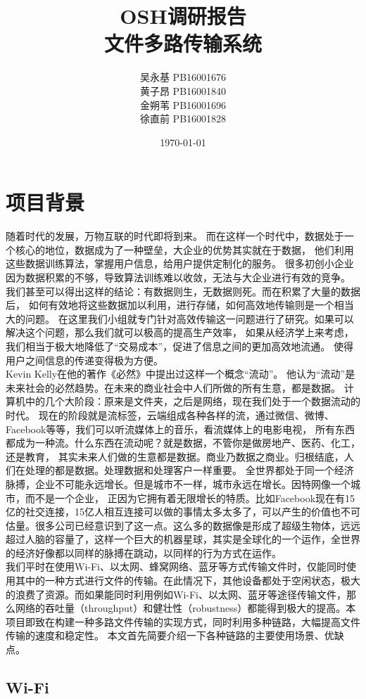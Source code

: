 \documentclass[11pt]{article}
\title{OSH调研报告\\[2ex]文件多路传输系统}
\author{吴永基 PB16001676\\黄子昂 PB16001840\\金朔苇 PB16001696\\徐直前 PB16001828}
\date{\today}
\begin{document}
\maketitle
\tableofcontents

\section{项目背景}
随着时代的发展，万物互联的时代即将到来。
而在这样一个时代中，数据处于一个核心的地位，数据成为了一种壁垒，大企业的优势其实就在于数据，
他们利用这些数据训练算法，掌握用户信息，给用户提供定制化的服务。
很多初创小企业因为数据积累的不够，导致算法训练难以收敛，无法与大企业进行有效的竞争。
我们甚至可以得出这样的结论：有数据则生，无数据则死。而在积累了大量的数据后，
如何有效地将这些数据加以利用，进行存储，如何高效地传输则是一个相当大的问题。
在这里我们小组就专门针对高效传输这一问题进行了研究。如果可以解决这个问题，那么我们就可以极高的提高生产效率，
如果从经济学上来考虑，我们相当于极大地降低了“交易成本”，促进了信息之间的更加高效地流通。
使得用户之间信息的传递变得极为方便。
\\
Kevin Kelly在他的著作《必然》中提出过这样一个概念“流动”。
他认为“流动”是未来社会的必然趋势。在未来的商业社会中人们所做的所有生意，都是数据。
计算机中的几个大阶段：原来是文件夹，之后是网络，现在我们处于一个数据流动的时代。
现在的阶段就是流标签，云端组成各种各样的流，通过微信、微博、Facebook等等，我们可以听流媒体上的音乐，看流媒体上的电影电视，
所有东西都成为一种流。什么东西在流动呢？就是数据，不管你是做房地产、医药、化工，还是教育，
其实未来人们做的生意都是数据。商业乃数据之商业。归根结底，人们在处理的都是数据。处理数据和处理客户一样重要。
全世界都处于同一个经济脉搏，企业不可能永远增长。但是城市不一样，城市永远在增长。因特网像一个城市，而不是一个企业，
正因为它拥有着无限增长的特质。比如Facebook现在有15亿的社交连接，15亿人相互连接可以做的事情太多太多了，可以产生的价值也不可估量。很多公司已经意识到了这一点。这么多的数据像是形成了超级生物体，远远超过人脑的容量了，这样一个巨大的机器星球，其实是全球化的一个运作，全世界的经济好像都以同样的脉搏在跳动，以同样的行为方式在运作。
\\
我们平时在使用Wi-Fi、以太网、蜂窝网络、蓝牙等方式传输文件时，仅能同时使用其中的一种方式进行文件的传输。在此情况下，其他设备都处于空闲状态，极大的浪费了资源。而如果能同时利用例如Wi-Fi、以太网、蓝牙等途径传输文件，那么网络的吞吐量（throughput）和健壮性（robustness）都能得到极大的提高。本项目即致在构建一种多路文件传输的实现方式，同时利用多种链路，大幅提高文件传输的速度和稳定性。
本文首先简要介绍一下各种链路的主要使用场景、优缺点。
\subsection{Wi-Fi}
\end{document}
